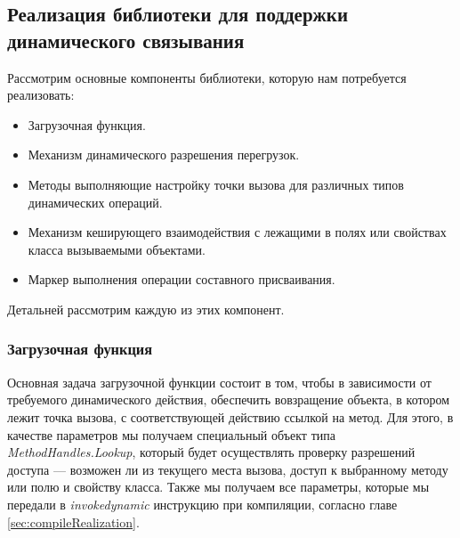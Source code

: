 \subsection{Реализация библиотеки для поддержки динамического связывания}
\label{sec:dynamicLibrary}

Рассмотрим основные компоненты библиотеки, которую нам потребуется реализовать:

\begin{itemize}
    \item Загрузочная функция.
    \item Механизм динамического разрешения перегрузок.
    \item Методы выполняющие настройку точки вызова для различных типов динамических операций.
    \item Механизм кеширующего взаимодействия с лежащими в полях или свойствах класса вызываемыми объектами.
    \item Маркер выполнения операции составного присваивания.
\end{itemize}

Детальней рассмотрим каждую из этих компонент.

\subsubsection{Загрузочная функция}

Основная задача загрузочной функции состоит в том, чтобы в зависимости от требуемого динамического действия, обеспечить вовзращение объекта, в котором лежит точка вызова, с соответствующей действию ссылкой на метод. Для этого, в качестве параметров мы получаем специальный объект типа \textit{MethodHandles.Lookup}, который будет осуществлять проверку разрешений доступа --- возможен ли из текущего места вызова, доступ к выбранному методу или полю и свойству класса. Также мы получаем все параметры, которые мы передали в \textit{invokedynamic} инструкцию при компиляции, согласно главе \ref{sec:compileRealization}.

